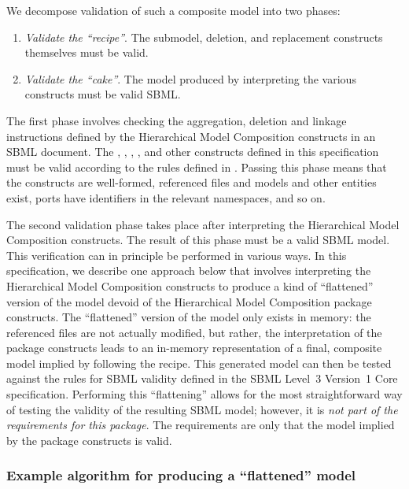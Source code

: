 We decompose validation of such a composite model into two phases:

\begin{enumerate}\setlength{\parskip}{0ex}

\item \emph{Validate the ``recipe''}.  The submodel, deletion, and
  replacement constructs themselves must be valid.

\item \emph{Validate the ``cake''}.  The model produced by interpreting
  the various constructs must be valid SBML.

\end{enumerate}

The first phase involves checking the aggregation, deletion and linkage
instructions defined by the Hierarchical Model Composition constructs in
an SBML document.  The \Submodel, \Port, \Deletion, \ReplacedElement,
\ReplacedBy and other constructs defined in this specification must be
valid according to the rules defined in .
Passing this phase means that the constructs are well-formed, referenced
files and models and other entities exist, ports have identifiers in the
relevant namespaces, and so on.

The second validation phase takes place after interpreting the
Hierarchical Model Composition constructs.  The result of this phase
must be a valid SBML model.  This verification can in principle be
performed in various ways.  In this specification, we describe one
approach below that involves interpreting the Hierarchical Model
Composition constructs to produce a kind of ``flattened'' version of the
model devoid of the Hierarchical Model Composition package constructs.
The ``flattened'' version of the model only exists in memory: the
referenced files are not actually modified, but rather, the
interpretation of the package constructs leads to an in-memory
representation of a final, composite model implied by following the
recipe.  This generated model can then be tested against the rules for
SBML validity defined in the SBML Level~3 Version~1 Core specification.
Performing this ``flattening'' allows for the most straightforward way
of testing the validity of the resulting SBML model; however, it is
\emph{not part of the requirements for this package}.  The requirements
are only that the model implied by the package constructs is valid.


\subsubsection{Example algorithm for producing a ``flattened'' model}


